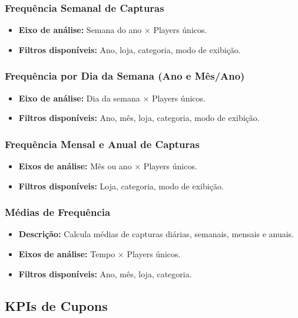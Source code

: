 \documentclass[12pt]{article}
\begin{document}
\subsubsection{Frequência Semanal de Capturas}
\begin{itemize}
    \item \textbf{Eixo de análise:} Semana do ano × Players únicos.
    \item \textbf{Filtros disponíveis:} Ano, loja, categoria, modo de exibição.
\end{itemize}

\subsubsection{Frequência por Dia da Semana (Ano e Mês/Ano)}
\begin{itemize}
    \item \textbf{Eixo de análise:} Dia da semana × Players únicos.
    \item \textbf{Filtros disponíveis:} Ano, mês, loja, categoria, modo de exibição.
\end{itemize}

\subsubsection{Frequência Mensal e Anual de Capturas}
\begin{itemize}
    \item \textbf{Eixos de análise:} Mês ou ano × Players únicos.
    \item \textbf{Filtros disponíveis:} Loja, categoria, modo de exibição.
\end{itemize}

\subsubsection{Médias de Frequência}
\begin{itemize}
    \item \textbf{Descrição:} Calcula médias de capturas diárias, semanais, mensais e anuais.
    \item \textbf{Eixos de análise:} Tempo × Players únicos.
    \item \textbf{Filtros disponíveis:} Ano, mês, loja, categoria.
\end{itemize}

\subsection{KPIs de Cupons}
\end{document}
